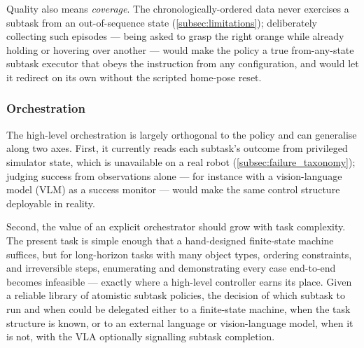 Quality also means \emph{coverage}. The chronologically-ordered data never exercises a subtask from an out-of-sequence state (\cref{subsec:limitations}); deliberately collecting such episodes --- being asked to grasp the right orange while already holding or hovering over another --- would make the policy a true from-any-state subtask executor that obeys the instruction from any configuration, and would let it redirect on its own without the scripted home-pose reset.

\subsubsection{Orchestration}

The high-level orchestration is largely orthogonal to the policy and can generalise along two axes. First, it currently reads each subtask's outcome from privileged simulator state, which is unavailable on a real robot (\cref{subsec:failure_taxonomy}); judging success from observations alone --- for instance with a vision-language model (VLM) as a success monitor --- would make the same control structure deployable in reality.

Second, the value of an explicit orchestrator should grow with task complexity. The present task is simple enough that a hand-designed finite-state machine suffices, but for long-horizon tasks with many object types, ordering constraints, and irreversible steps, enumerating and demonstrating every case end-to-end becomes infeasible --- exactly where a high-level controller earns its place. Given a reliable library of atomistic subtask policies, the decision of which subtask to run and when could be delegated either to a finite-state machine, when the task structure is known, or to an external language or vision-language model, when it is not, with the VLA optionally signalling subtask completion.
